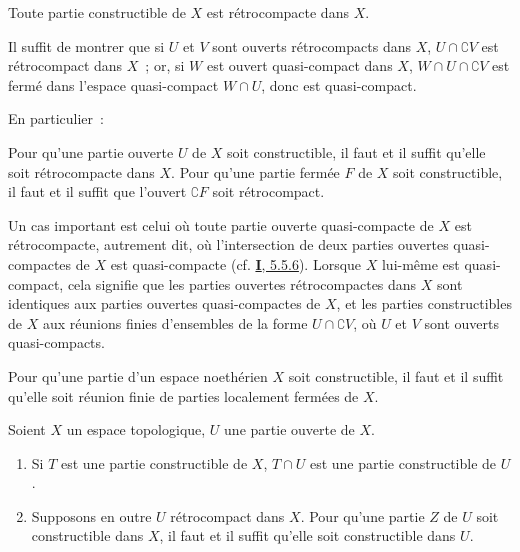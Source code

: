 \begin{corollary}[9.1.4]
\label{0.9.1.4-fr}
Toute partie constructible de $X$ est rétrocompacte dans $X$.
\end{corollary}

Il suffit de montrer que si $U$ et $V$ sont ouverts rétrocompacts dans $X$,
$U\cap\complement{V}$ est rétrocompact dans $X$~; or, si $W$ est ouvert
quasi-compact dans $X$, $W\cap U\cap\complement{V}$ est fermé dans l'espace
quasi-compact $W\cap U$, donc est quasi-compact.

En particulier~:

\begin{corollary}[9.1.5]
\label{0.9.1.5-fr}
Pour qu'une partie ouverte $U$ de $X$ soit constructible, il faut et il
suffit qu'elle soit rétrocompacte dans $X$. Pour qu'une partie fermée $F$ de
$X$ soit constructible, il faut et il suffit que l'ouvert $\complement{F}$
soit rétrocompact.
\end{corollary}

\begin{env}[9.1.6]
\label{0.9.1.6-fr}
Un cas important est celui où toute partie ouverte quasi-compacte de $X$ est
rétrocompacte, autrement dit, où l'intersection de deux parties ouvertes
quasi-compactes de $X$ est quasi-compacte
(cf. \hyperref[I.5.5.6-fr]{\textbf{I}, 5.5.6}). Lorsque $X$ lui-même est
quasi-compact, cela signifie que les parties ouvertes rétrocompactes dans
$X$ sont identiques aux parties ouvertes quasi-compactes de $X$, et les
parties constructibles de $X$ aux réunions finies d'ensembles de la forme
$U\cap\complement{V}$, où $U$ et $V$ sont ouverts quasi-compacts.
\end{env}

\begin{corollary}[9.1.7]
\label{0.9.1.7-fr}
Pour qu'une partie d'un espace noethérien $X$ soit constructible, il faut et
il suffit qu'elle soit réunion finie de parties localement fermées de $X$.
\end{corollary}

\begin{proposition}[9.1.8]
\label{0.9.1.8-fr}
Soient $X$ un espace topologique, $U$ une partie ouverte de $X$.
\begin{enumerate}
  \item[\textup{(i)}] Si $T$ est une partie constructible de $X$, $T\cap U$ est une
    partie constructible de $U$.
  \item[\textup{(ii)}] Supposons en outre $U$ rétrocompact dans $X$. Pour qu'une
    partie $Z$ de $U$ soit constructible dans $X$, il faut et il suffit
    qu'elle soit constructible dans $U$.
\end{enumerate}
\end{proposition}

